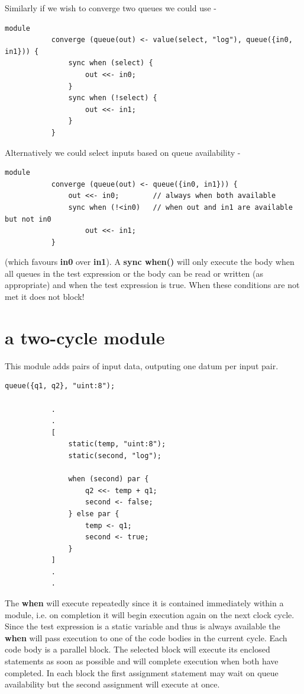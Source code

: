         Similarly if we wish to converge two queues we could use -
        \begin{lstlisting}[gobble=8, language=threepl]
           module
           converge (queue(out) <- value(select, "log"), queue({in0, in1})) {
               sync when (select) {
                   out <<- in0;
               }
               sync when (!select) {
                   out <<- in1;
               }
           }
        \end{lstlisting}
        Alternatively we could select inputs based on queue availability -
        \begin{lstlisting}[gobble=8, language=threepl]
           module
           converge (queue(out) <- queue({in0, in1})) {
               out <<- in0;        // always when both available
               sync when (!<in0)   // when out and in1 are available but not in0
                   out <<- in1;
           }
        \end{lstlisting}
        (which favours {\bf in0} over {\bf in1}). A {\bf sync when()} will
        only execute the body when all queues in the test expression or
        the body can be read or written (as appropriate) and when the test
        expression is true. When these conditions are not met it does not block!

    \section{a two-cycle module}\label{sec:ex2c}

        This module adds pairs of input data,
        outputing one datum per input pair.
        \begin{lstlisting}[gobble=8, language=threepl]
           queue({q1, q2}, "uint:8");

           .
           .
           [
               static(temp, "uint:8");
               static(second, "log");

               when (second) par {
                   q2 <<- temp + q1;
                   second <- false;
               } else par {
                   temp <- q1;
                   second <- true;
               }
           ]
           .
           .
        \end{lstlisting}
        The {\bf when} will execute repeatedly since it is
        contained immediately within a module, i.e. on
        completion it will begin execution again on the next
        clock cycle. Since the test expression is a static
        variable and thus is always available the {\bf when}
        will pass execution to one of the code bodies
        in the current cycle. Each code body is a parallel
        block. The selected block will execute its enclosed
        statements as soon as possible and will complete
        execution when both have completed. In each block the
        first assignment statement may wait on queue availability
        but the second assignment will execute at once.

